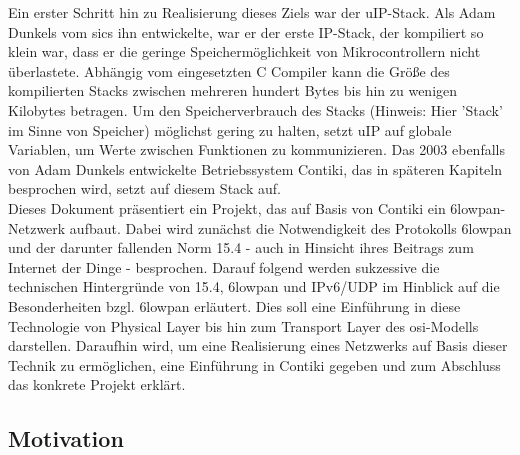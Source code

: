 	Ein erster Schritt hin zu Realisierung dieses Ziels war der uIP-Stack. Als Adam Dunkels vom \ac{sics} ihn entwickelte, war er der erste IP-Stack, der kompiliert so klein war, dass er die geringe Speichermöglichkeit von Mikrocontrollern nicht überlastete. Abhängig vom eingesetzten C Compiler kann die Größe des kompilierten Stacks zwischen mehreren hundert Bytes bis hin zu wenigen Kilobytes betragen. Um den Speicherverbrauch des Stacks (Hinweis: Hier 'Stack' im Sinne von Speicher) möglichst gering zu halten, setzt uIP auf globale Variablen, um Werte zwischen Funktionen zu kommunizieren.\cite[S.5]{dunkelsuip} Das 2003 ebenfalls von Adam Dunkels entwickelte Betriebssystem Contiki, das in späteren Kapiteln besprochen wird, setzt auf diesem Stack auf.\\
	Dieses Dokument präsentiert ein Projekt, das auf Basis von Contiki ein \ac{6lowpan}-Netzwerk aufbaut. Dabei wird zunächst die Notwendigkeit des Protokolls \ac{6lowpan} und der darunter fallenden Norm \ac{15.4} - auch in Hinsicht ihres Beitrags zum Internet der Dinge - besprochen. Darauf folgend werden sukzessive die technischen Hintergründe von \ac{15.4}, \ac{6lowpan} und IPv6/UDP im Hinblick auf die Besonderheiten bzgl. \ac{6lowpan} erläutert. Dies soll eine Einführung in diese Technologie von Physical Layer bis hin zum Transport Layer des \ac{osi}-Modells darstellen. Daraufhin wird, um eine Realisierung eines Netzwerks auf Basis dieser Technik zu ermöglichen, eine Einführung in Contiki gegeben und zum Abschluss das konkrete Projekt erklärt. 

\subsection{Motivation}

